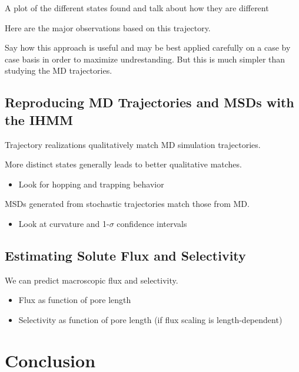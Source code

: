 \documentclass{article}
\begin{document}
  A plot of the different states found and talk about how they are different
  
  Here are the major observations based on this trajectory.
  
  Say how this approach is useful and may be best applied carefully on a case by 
  case basis in order to maximize undrestanding. But this is much simpler than
  studying the MD trajectories.
  
  
  \subsection{Reproducing MD Trajectories and MSDs with the IHMM}
    
  \noindent Trajectory realizations qualitatively match MD simulation trajectories.
  
  More distinct states generally leads to better qualitative matches.

  \begin{itemize}
    \item Look for hopping and trapping behavior
  \end{itemize}
  
  \noindent MSDs generated from stochastic trajectories match those from MD.
  \begin{itemize}
  	\item Look at curvature and 1-$\sigma$ confidence intervals
  \end{itemize}
  
  \subsection{Estimating Solute Flux and Selectivity}  
  
  \noindent We can predict macroscopic flux and selectivity.
  \begin{itemize}
  	\item Flux as function of pore length
  	\item Selectivity as function of pore length (if flux scaling is length-dependent)
  \end{itemize}
 
  \section{Conclusion}
  
\end{document}
